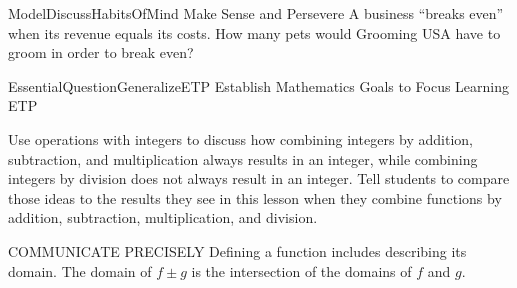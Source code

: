 \documentclass{article}
\newenvironment{concept-box}{}{}        %
\newenvironment{te-addendum}[2]{}{}     %
\newcommand{\answer}[1]{}               %
\begin{document}
\begin{te-addendum}{ModelDiscuss}{HabitsOfMind}
Make Sense and Persevere A business ``breaks even'' when its revenue equals its costs. How many pets would Grooming USA have to groom in order to break even?
\answer{100 pets.}
\end{te-addendum}

\begin{te-addendum}{EssentialQuestion}{GeneralizeETP}
Establish Mathematics Goals to Focus Learning ETP

Use operations with integers to discuss how combining integers by addition, subtraction, and multiplication always results in an integer, while combining integers by division does not always result in an integer. Tell students to compare those ideas to the results they see in this lesson when they combine functions by addition, subtraction, multiplication, and division.
\end{te-addendum}

\begin{concept-box}
COMMUNICATE PRECISELY Defining a function includes describing its domain. The domain of \(f \pm g\) is the intersection of the domains of \(f\) and \(g\).
\end{concept-box}
\end{document}
